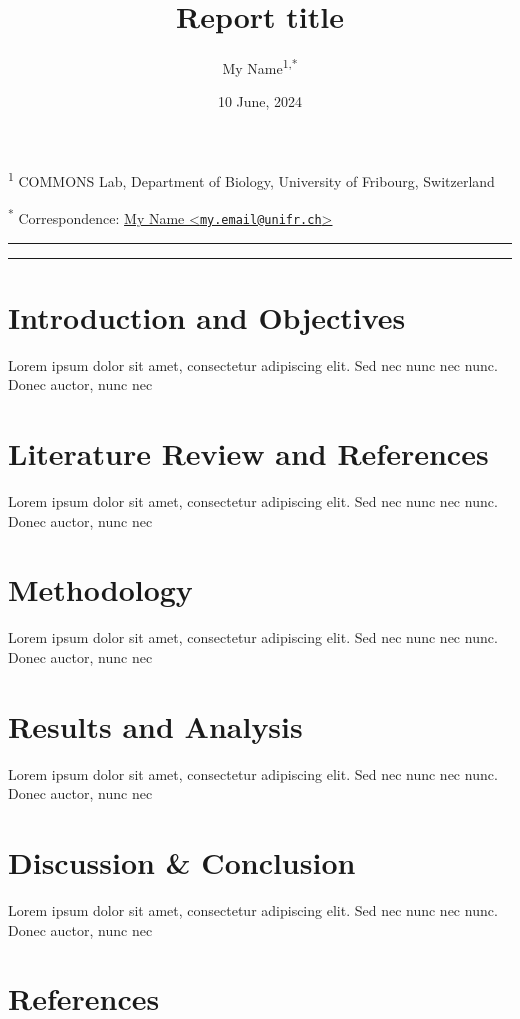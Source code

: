 \documentclass[
]{article}
\title{Report title}
\subtitle{\hypertarget{report-subtitle}{%
\subsection{Report subtitle}\label{report-subtitle}}

\texttt{[image: ../docs/ressources/img/logo\_unifr.png]}}
\author{My Name\textsuperscript{1,*}}
\date{10 June, 2024}
\let\oldsection\section
\renewcommand\section{\oldsection}
\begin{document}
\maketitle

\textsuperscript{1} COMMONS Lab, Department of Biology, University of Fribourg, Switzerland

\textsuperscript{*} Correspondence: \href{mailto:my.email@unifr.ch}{My Name \textless{}\href{mailto:my.email@unifr.ch}{\nolinkurl{my.email@unifr.ch}}\textgreater{}}

\begin{center}\rule{0.5\linewidth}{0.5pt}\end{center}

\begin{center}\rule{0.5\linewidth}{0.5pt}\end{center}

\hypertarget{introduction-and-objectives}{%
\section{Introduction and Objectives}\label{introduction-and-objectives}}

Lorem ipsum dolor sit amet, consectetur adipiscing elit. Sed nec nunc nec nunc. Donec auctor, nunc nec

\hypertarget{literature-review-and-references}{%
\section{Literature Review and References}\label{literature-review-and-references}}

Lorem ipsum dolor sit amet, consectetur adipiscing elit. Sed nec nunc nec nunc. Donec auctor, nunc nec

\hypertarget{methodology}{%
\section{Methodology}\label{methodology}}

Lorem ipsum dolor sit amet, consectetur adipiscing elit. Sed nec nunc nec nunc. Donec auctor, nunc nec

\hypertarget{results-and-analysis}{%
\section{Results and Analysis}\label{results-and-analysis}}

Lorem ipsum dolor sit amet, consectetur adipiscing elit. Sed nec nunc nec nunc. Donec auctor, nunc nec

\hypertarget{discussion-conclusion}{%
\section{Discussion \& Conclusion}\label{discussion-conclusion}}

Lorem ipsum dolor sit amet, consectetur adipiscing elit. Sed nec nunc nec nunc. Donec auctor, nunc nec

\hypertarget{references}{%
\section{References}\label{references}}
\end{document}
